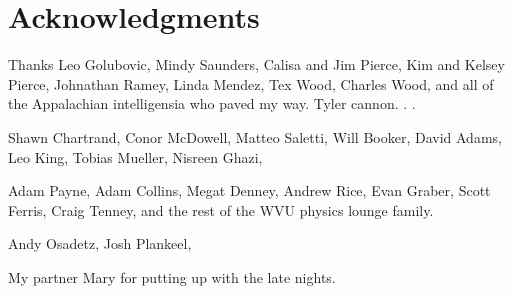 
\chapter{Acknowledgments}

Thanks Leo Golubovic, Mindy Saunders, Calisa and Jim Pierce, Kim and Kelsey Pierce, Johnathan Ramey, Linda Mendez, Tex Wood, Charles Wood, and all of the Appalachian intelligensia who paved my way. Tyler cannon. . . 

Shawn Chartrand, Conor McDowell, Matteo Saletti, Will Booker, David Adams, Leo King, Tobias Mueller, Nisreen Ghazi, 

Adam Payne, Adam Collins, Megat Denney, Andrew Rice, Evan Graber, Scott Ferris, Craig Tenney, and the rest of the WVU physics lounge family.

Andy Osadetz, Josh Plankeel, 

My partner Mary for putting up with the late nights.